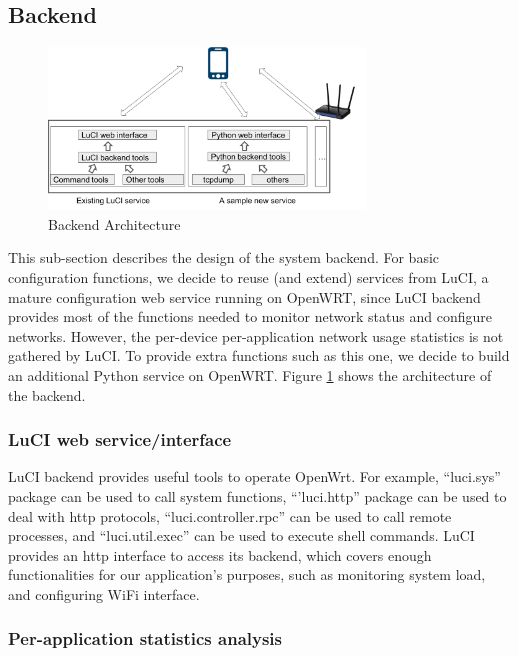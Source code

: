 \subsection{Backend}

\begin{figure}
	\centering
	\includegraphics[width=0.75\textwidth]{backend-architecture.png}
	\caption{Backend Architecture}
	\label{backend-architecture}
\end{figure}

This sub-section describes the design of the system backend. For basic configuration functions, we decide to reuse (and extend) services from LuCI, a mature configuration web service running on OpenWRT, since LuCI backend provides most of the functions needed to monitor network status and configure networks. However, the per-device per-application network usage statistics is not gathered by LuCI. To provide extra functions such as this one, we decide to build an additional Python service on OpenWRT. Figure \ref{backend-architecture} shows the architecture of the backend.

\subsubsection{LuCI web service/interface}

LuCI backend provides useful tools to operate OpenWrt. For example, ``luci.sys'' package can be used to call system functions, ``'luci.http'' package can be used to deal with http protocols, ``luci.controller.rpc'' can be used to call remote processes, and ``luci.util.exec'' can be used to execute shell commands. LuCI provides an http interface to access its backend, which covers enough functionalities for our application's purposes, such as monitoring system load, and configuring WiFi interface.

\subsubsection{Per-application statistics analysis}
\label{sec:app-specific-design}

